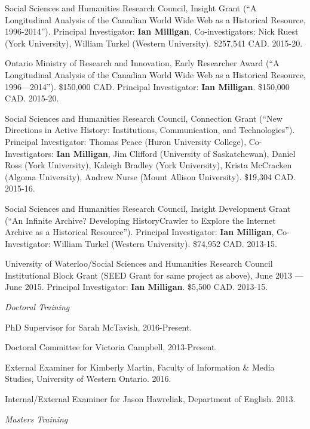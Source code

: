 \documentclass[11pt,article,oneside]{memoir}
\begin{document}
\ind Social Sciences and Humanities Research Council, Insight Grant (``A Longitudinal Analysis of the Canadian World Wide Web as a Historical Resource, 1996-2014''). Principal Investigator: \textbf{Ian Milligan}, Co-investigators: Nick Ruest (York University), William Turkel (Western University). \$257,541 CAD. 2015-20.

\ind Ontario Ministry of Research and Innovation, Early Researcher Award (``A Longitudinal Analysis of the Canadian World Wide Web as a Historical Resource, 1996---2014''). \$150,000 CAD. Principal Investigator: \textbf{Ian Milligan}. \$150,000 CAD. 2015-20.

\ind Social Sciences and Humanities Research Council, Connection Grant (``New Directions in Active History: Institutions, Communication, and Technologies''). Principal Investigator: Thomas Peace (Huron University College), Co-Investigators: \textbf{Ian Milligan}, Jim Clifford (University of Saskatchewan), Daniel Ross (York University), Kaleigh Bradley (York University), Krista McCracken (Algoma University), Andrew Nurse (Mount Allison University). \$19,304 CAD. 2015-16.

\ind Social Sciences and Humanities Research Council, Insight Development Grant (``An Infinite Archive? Developing HistoryCrawler to Explore the Internet Archive as a Historical Resource''). Principal Investigator: \textbf{Ian Milligan}, Co-Investigator: William Turkel (Western University).  \$74,952 CAD. 2013-15.

\ind University of Waterloo/Social Sciences and Humanities Research Council Institutional Block Grant (SEED Grant for same project as above), June 2013 --- June 2015. Principal Investigator: \textbf{Ian Milligan}. \$5,500 CAD. 2013-15.
\medskip 


\medskip
\noindent\emph{Doctoral Training \vspace{0.01in}}

\ind PhD Supervisor for Sarah McTavish, 2016-Present.

\ind Doctoral Committee for Victoria Campbell, 2013-Present.

\ind External Examiner for Kimberly Martin, Faculty of Information \& Media Studies, University of Western Ontario. 2016.

\ind Internal/External Examiner for Jason Hawreliak, Department of English. 2013.

\medskip
\noindent\emph{Masters Training \vspace{0.01in}}
\end{document}
